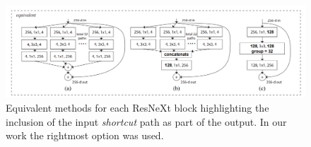 \documentclass[12pt]{article}
\numberwithin{equation}{section}
\numberwithin{figure}{section}
\begin{document}
	\begin{figure}[H]
		\centering
		\captionsetup{justification=centering}
		\includegraphics[scale=0.5]{resnextblocks.PNG}
		\caption{\cite{Xie2016} Equivalent methods for each ResNeXt block highlighting the inclusion of the input \emph{shortcut} path as part of the output. In our work the rightmost option was used.}
		\label{fig:resnextblocks}
	\end{figure}
\end{document}
